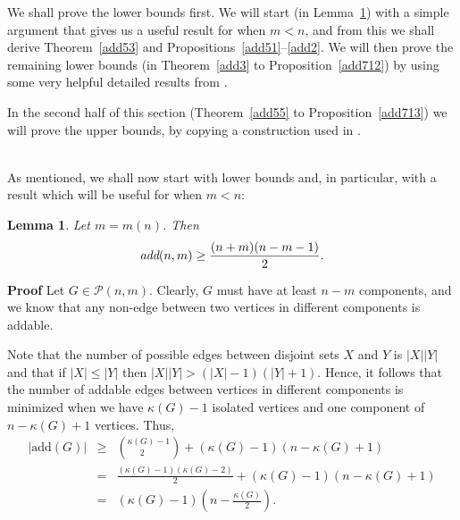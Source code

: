 \documentclass{article}
\newtheorem{Lemma}[Theorem]{Lemma}
\newtheorem{Proof of Theorem}{Proof of Theorem}
\begin{document}
We shall prove the lower bounds first.
We will start (in Lemma~\ref{add33}) with a simple argument that gives us a useful result for when $m<n$,
and from this we shall derive Theorem~\ref{add53} and Propositions~\ref{add51}--\ref{add2}.
We will then prove the remaining lower bounds (in Theorem~\ref{add3} to Proposition~\ref{add712})
by using some very helpful detailed results from \cite{ger2}.

In the second half of this section (Theorem~\ref{add55} to Proposition~\ref{add713})
we will prove the upper bounds,
by copying a construction used in \cite{ger2}.





\begin{figure}[omitted: a diagram of this paper's results, not reproduced here]\end{figure}















\begin{displaymath}
\end{displaymath} \\

As mentioned, we shall now start with lower bounds and,
in particular, with a result which will be useful for when $m<n$: 















\begin{Lemma} \label{add33}
Let $m=m(n)$. 
Then 
\begin{displaymath}
\emph{add}(n,m) \geq \frac{(n+m)(n-m-1)}{2}.
\end{displaymath}
\end{Lemma}
\textbf{Proof} 
Let $G \in \mathcal{P}(n,m)$.
Clearly, $G$ must have at least $n-m$ components,
and we know that any non-edge between two vertices in different components is addable.

Note that 
the number of possible edges between disjoint sets $X$ and $Y$ is $|X||Y|$ and
that if $|X| \leq |Y|$ then $|X||Y| > (|X|-1)(|Y|+1)$.
Hence, it follows that the number of addable edges between vertices in different components is minimized when
we have $\kappa(G)-1$ isolated vertices and one component of $n- \kappa(G)+1$ vertices.
Thus, 
\begin{eqnarray*}
|\textrm{add}(G)| & \geq & \left(^{\kappa(G)-1}_{\phantom{ww}2}\right) + (\kappa(G)-1)(n-\kappa(G)+1) \\
& = & \frac{(\kappa(G)-1)(\kappa(G)-2)}{2} + (\kappa(G)-1)(n- \kappa(G)+1) \\
& = & (\kappa(G)-1) \left( n - \frac{\kappa(G)}{2} \right).
\end{eqnarray*}
\end{document}
